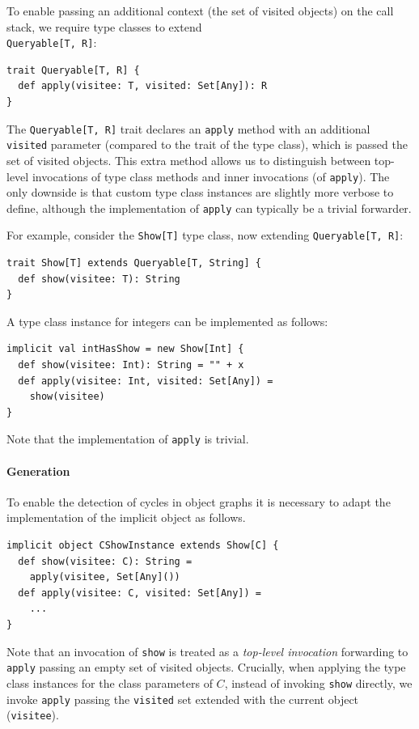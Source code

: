 \documentclass[preprint]{sigplanconf}
\begin{document}
To enable passing an additional context (the set of visited objects) on the call stack,
we require type classes to extend \\\verb|Queryable[T, R]|:

\begin{lstlisting}
trait Queryable[T, R] {
  def apply(visitee: T, visited: Set[Any]): R
}
\end{lstlisting}
\noindent
The \verb|Queryable[T, R]| trait declares an \verb|apply| method with an
additional \verb|visited| parameter (compared to the trait of the type class),
which is passed the set of visited objects. This extra method allows us to
distinguish between top-level invocations of type class methods and inner
invocations (of \verb|apply|). The only downside is that custom type class
instances are slightly more verbose to define, although the implementation of
\verb|apply| can typically be a trivial forwarder.

For example, consider the \verb|Show[T]| type class, now extending
\verb|Queryable[T, R]|:
\begin{lstlisting}
trait Show[T] extends Queryable[T, String] {
  def show(visitee: T): String
}
\end{lstlisting}
\noindent
A type class instance for integers can be implemented as follows:
\begin{lstlisting}
implicit val intHasShow = new Show[Int] {
  def show(visitee: Int): String = "" + x
  def apply(visitee: Int, visited: Set[Any]) =
    show(visitee)
}
\end{lstlisting}
\noindent
Note that the implementation of \verb|apply| is trivial.

\paragraph{Generation}

To enable the detection of cycles in object graphs it is necessary to
adapt the implementation of the implicit object as follows.

\begin{lstlisting}
implicit object CShowInstance extends Show[C] {
  def show(visitee: C): String =
    apply(visitee, Set[Any]())
  def apply(visitee: C, visited: Set[Any]) =
    ...
}
\end{lstlisting}
\noindent
Note that an invocation of \verb|show| is treated as a \emph{top-level
invocation} forwarding to \verb|apply| passing an empty set of visited
objects. Crucially, when applying the type class instances for the class
parameters of $C$, instead of invoking \verb|show| directly, we invoke
\verb|apply| passing the \verb|visited| set extended with the current object
(\verb|visitee|).
\end{document}

